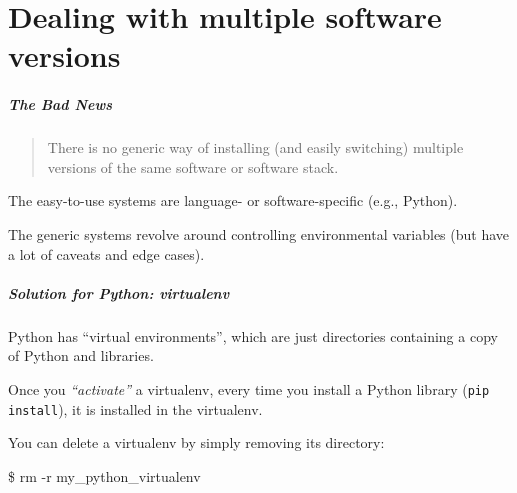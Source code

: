 \documentclass[english,serif,mathserif,usenames,dvipsnames]{beamer}
\begin{document}
\part{Dealing with multiple software versions}

\begin{frame}
  \frametitle{The Bad News}

  \begin{quote}
    There is no generic way of installing (and easily switching)
    multiple versions of the same software or software stack.
  \end{quote}

  \+
  The easy-to-use systems are language- or
  software-specific (e.g., Python).

  \+
  The generic systems revolve around controlling environmental
  variables (but have a lot of caveats and edge cases).
\end{frame}

\begin{frame}[fragile]
  \frametitle{Solution for Python: virtualenv}

  Python has ``virtual environments'', which are just directories
  containing a copy of Python and libraries.

  \+
  Once you \emph{``activate''} a virtualenv, every time you install
  a Python library (\texttt{pip install}), it is installed in the
  virtualenv.

  \+
  You can delete a virtualenv by simply removing its directory:
\begin{semiverbatim}
\$ rm -r my_python_virtualenv
\end{semiverbatim}
\end{frame}
\end{document}
